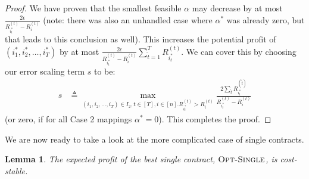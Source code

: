 \documentclass{article}
\newtheorem{lemma}[theorem]{Lemma}
\newcommand{\TransferCoefficient}{\alpha}
\newcommand{\OSingle}{\textsc{Opt-Single}}
\newcommand{\actionmapping}{(i_1, i_2, \ldots, i_T)}
\newcommand{\optactionmapping}{(i^*_1, i^*_2, \ldots, i^*_T)}
\begin{document}
\begin{proof}
  We have proven that the smallest feasible $\TransferCoefficient$ may decrease by at most $\frac{2 \epsilon}{R^{(t)}_{i^*_t} - R^{(t)}_i}$ (note: there was also an unhandled case where $\TransferCoefficient^*$ was already zero, but that leads to this conclusion as well). This increases the potential profit of $\optactionmapping$ by at most $\frac{2 \epsilon}{R^{(t)}_{i^*_t} - R^{(t)}_i} \sum_{\tilde{t}=1}^T R^{(t)}_{i^*_t}$. We can cover this by choosing our error scaling term $s$ to be:
  \begin{align*}
    s &\triangleq \max_{\actionmapping \in I_2, t \in [T], i \in [n] . R^{(t)}_{i^*_t} > R^{(t)}_i} \frac{2 \sum_{\tilde{t}} R^{(\tilde{t})}_{i^*_t}}{R^{(t)}_{i^*_t} - R^{(t)}_i}
  \end{align*}
  (or zero, if for all Case 2 mappings $\TransferCoefficient^* = 0$). This completes the proof.
\end{proof}

We are now ready to take a look at the more complicated case of single contracts.

\begin{lemma}\label{lem:single-stable}
  The expected profit of the best single contract, $\OSingle$, is cost-stable.
\end{lemma}
\end{document}
